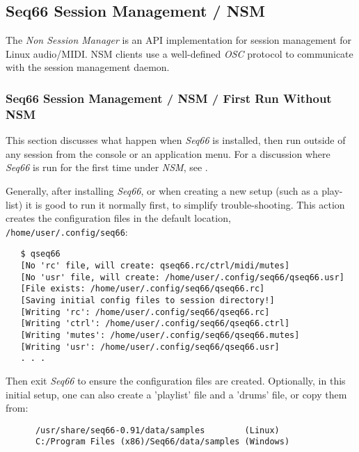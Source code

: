 \subsection{Seq66 Session Management / NSM}
\label{subsec:sessions_nsm}

   The \textsl{Non Session Manager} is an API implementation for session
   management for Linux audio/MIDI. NSM clients use a well-defined
   \textsl{OSC} protocol to communicate with the session management daemon.

\subsubsection{Seq66 Session Management / NSM / First Run Without NSM}
\label{subsec:sessions_nsm_first_run_without_nsm}

   This section discusses what happen when \textsl{Seq66} is installed, then
   run outside of any session from the console or an application menu.
   For a discussion where \textsl{Seq66} is run for the first time under
   \textsl{NSM},
   see .

   Generally, after installing \textsl{Seq66}, or when creating a new setup
   (such as a play-list) it is good to run it normally first, to simplify
   trouble-shooting.
   This action creates the configuration files in the default location,
   \texttt{/home/user/.config/seq66}:

\begin{verbatim}
   $ qseq66 
   [No 'rc' file, will create: qseq66.rc/ctrl/midi/mutes]
   [No 'usr' file, will create: /home/user/.config/seq66/qseq66.usr]
   [File exists: /home/user/.config/seq66/qseq66.rc]
   [Saving initial config files to session directory!]
   [Writing 'rc': /home/user/.config/seq66/qseq66.rc]
   [Writing 'ctrl': /home/user/.config/seq66/qseq66.ctrl]
   [Writing 'mutes': /home/user/.config/seq66/qseq66.mutes]
   [Writing 'usr': /home/user/.config/seq66/qseq66.usr]
   . . .
\end{verbatim}

   Then exit \textsl{Seq66} to ensure the configuration files are created.
   Optionally, in this initial setup,
   one can also create a 'playlist' file and a 'drums' file, or
   copy them from:

   \begin{verbatim}
      /usr/share/seq66-0.91/data/samples        (Linux)
      C:/Program Files (x86)/Seq66/data/samples (Windows)
   \end{verbatim}

